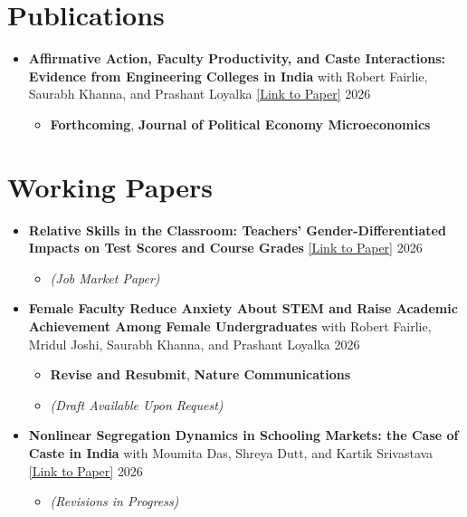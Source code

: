 \documentclass[letter,11pt]{article}
\newcommand{\dateright}[1]{\hfill{\small #1}}
\begin{document}
\section{Publications}
\begin{itemize}
    \item[] {\textbf{Affirmative Action, Faculty Productivity, and Caste Interactions: Evidence from Engineering Colleges in India}} {\small{with Robert Fairlie, Saurabh Khanna, and Prashant Loyalka} \href{https://www.journals.uchicago.edu/doi/10.1086/743985}{[Link to Paper]}} \dateright{2026}
        \begin{itemize}
            \item[] \small{\textbf{Forthcoming}, \textbf{Journal of Political Economy Microeconomics}}
         \end{itemize}
\end{itemize}

\section{Working Papers}
\begin{itemize}
\item[] {\textbf{Relative Skills in the Classroom: Teachers’ Gender-Differentiated Impacts on Test Scores and Course Grades}} {\small{\href{https://gagandeep-sachdeva.com/JMP%20Sachdeva.pdf}{[Link to Paper]}}}  \dateright{2026}
\begin{itemize}
    \item[] {\small{\textit{(Job Market Paper)}}}
\end{itemize}

\item[] \textbf{Female Faculty Reduce Anxiety About STEM and Raise Academic Achievement Among Female Undergraduates} {\small{with Robert Fairlie, Mridul Joshi, Saurabh Khanna, and Prashant Loyalka}} \dateright{2026}
        \begin{itemize}
             \item[] \small{\textbf{Revise and Resubmit}, \textbf{Nature Communications}}
             \item[] \textit{(Draft Available Upon Request)}
        \end{itemize}
\item[] {\textbf{Nonlinear Segregation Dynamics in Schooling Markets: the Case of Caste in India}} {\small{with Moumita Das, Shreya Dutt, and Kartik Srivastava \href{https://papers.ssrn.com/sol3/papers.cfm?abstract_id=6807040}{[Link to Paper]}}} \dateright{2026}
\begin{itemize}
    \item[] {\small{\textit{(Revisions in Progress)}}}
\end{itemize}
\end{itemize}
\end{document}
